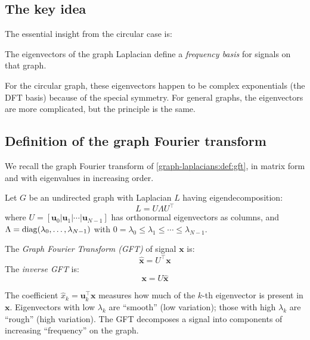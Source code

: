 \begin{notechapter}
\subsection{The key idea}

The essential insight from the circular case is:

\begin{keyidea}
The eigenvectors of the graph Laplacian define a \emph{frequency basis} for signals on that graph.
\end{keyidea}

For the circular graph, these eigenvectors happen to be complex
exponentials (the DFT basis) because of the special symmetry. For
general graphs, the eigenvectors are more complicated, but the
principle is the same.

\subsection{Definition of the graph Fourier transform}

We recall the graph Fourier transform of \cref{graph-laplacians:def:gft}, in matrix form and with eigenvalues in increasing order.

\begin{definition}\label{dft-to-gnn:def:gft}
Let $G$ be an undirected graph with Laplacian $L$ having eigendecomposition:
\begin{equation}
L = U \Lambda U^\top
\end{equation}
where $U = [\mathbf{u}_0 | \mathbf{u}_1 | \cdots | \mathbf{u}_{N-1}]$
has orthonormal eigenvectors as columns, and
$\Lambda = \operatorname{diag}(\lambda_0, \ldots, \lambda_{N-1})$ with
$0 = \lambda_0 \leq \lambda_1 \leq \cdots \leq \lambda_{N-1}$.

The \emph{Graph Fourier Transform (GFT)} of signal $\mathbf{x}$ is:
\begin{equation}
\hat{\mathbf{x}} = U^\top \mathbf{x}
\end{equation}
The \emph{inverse GFT} is:
\begin{equation}
\mathbf{x} = U \hat{\mathbf{x}}
\end{equation}
\end{definition}

\begin{remark}
The coefficient $\hat{x}_k = \mathbf{u}_k^\top \mathbf{x}$ measures how
much of the $k$-th eigenvector is present in $\mathbf{x}$. Eigenvectors
with low $\lambda_k$ are ``smooth'' (low variation); those with high
$\lambda_k$ are ``rough'' (high variation). The GFT decomposes a signal
into components of increasing ``frequency'' on the graph.
\end{remark}


\end{notechapter}
